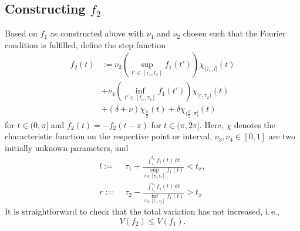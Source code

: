 \documentclass{article}
\newcommand{\ite}{i.\,e.\xspace}
\newcommand{\dt}{\,\mathrm{d}t}
\begin{document}
\subsection{Constructing $f_2$}

Based on $f_1$ as constructed above with $\nu_1$ and $\nu_2$ chosen such that the Fourier condition is fulfilled, define the step function 
\begin{equation} \label{eq:def_f2}
    \begin{aligned}
        f_2(t) &:= \nu_3 \left(\sup_{t'\in[\tau_1,t_x]} f_1(t')\right)\chi_{(\tau_1,l]}(t) \\
        &+ \nu_4\left(\inf_{t'\in[t_x, \tau_2]} f_1(t')\right) \chi_{[r,\tau_2)}(t)\\
        &+ (\delta + \nu) \chi_{\frac{\pi}{2}}(t) + \delta \chi_{(\frac{\pi}{2}, \pi]}(t)      
    \end{aligned}
\end{equation}
for $t \in (0,\pi]$ and $f_2(t) = - f_2(t-\pi)$ for $t \in (\pi, 2\pi]$. Here, $\chi$ denotes the characteristic function on the respective point or interval, 
$\nu_3, \nu_4 \in [0,1]$ are two initially unknown parameters, and
\begin{align*}
    l :=\;& \tau_1 + \frac{\int_{\tau_1}^{t_x} f_1(t) \dt}{\sup_{t\in[\tau_1,t_x]} f_1(t)}  < t_x,\\
    r :=\;& \tau_2 -\frac{\int_{t_x}^{\tau_2} f_1(t) \dt}{\inf_{t\in[t_x, \tau_2]} f_1(t)} > t_x
\end{align*}
It is straightforward to check that the total variation has not increased, \ite, 
\[V(f_2) \le V(f_1).\]
\end{document}
